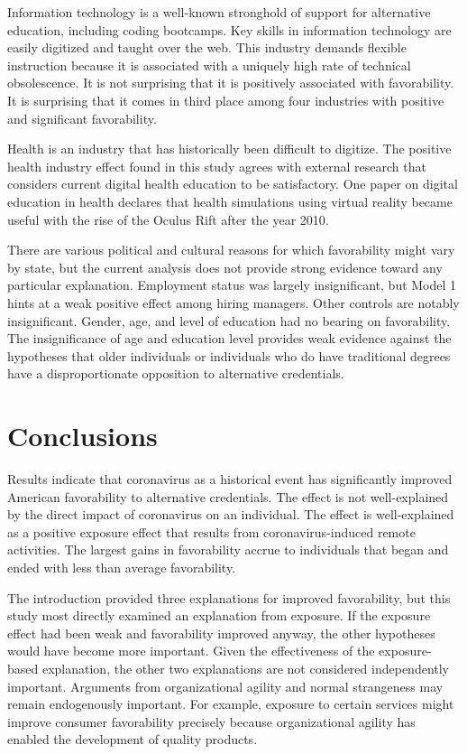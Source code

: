 \documentclass[review]{elsarticle}
\begin{document}
Information technology is a well-known stronghold of support for alternative education, including coding bootcamps.
Key skills in information technology are easily digitized and taught over the web.
This industry demands flexible instruction because it is associated with a uniquely high rate of technical obsolescence.
It is not surprising that it is positively associated with favorability.
It is surprising that it comes in third place among four industries with positive and significant favorability.

Health is an industry that has historically been difficult to digitize.
The positive health industry effect found in this study
agrees with external research that considers current digital health education to be satisfactory.
One paper on digital education in health declares that health simulations using virtual reality
became useful with the rise of the Oculus Rift after the year 2010\cite{giuseppe2015new}.

There are various political and cultural reasons for which favorability might vary by state, but the current analysis does not provide strong evidence toward any particular explanation.
Employment status was largely insignificant, but Model 1 hints at a weak positive effect among hiring managers.
Other controls are notably insignificant.
Gender, age, and level of education had no bearing on favorability.
The insignificance of age and education level provides weak evidence
against the hypotheses that older individuals or individuals who do have traditional degrees
have a disproportionate opposition to alternative credentials.

\section{Conclusions}

Results indicate that coronavirus as a historical event has significantly improved American favorability to alternative credentials.
The effect is not well-explained by the direct impact of coronavirus on an individual.
The effect is well-explained as a positive exposure effect that results from coronavirus-induced remote activities.
The largest gains in favorability accrue to individuals that began and ended with less than average favorability.

The introduction provided three explanations for improved favorability,
but this study most directly examined an explanation from exposure.
If the exposure effect had been weak and favorability improved anyway,
the other hypotheses would have become more important.
Given the effectiveness of the exposure-based explanation, the other two explanations are not considered independently important.
Arguments from organizational agility and normal strangeness may remain endogenously important.
For example, exposure to certain services might improve consumer favorability precisely because
organizational agility has enabled the development of quality products.
\end{document}

